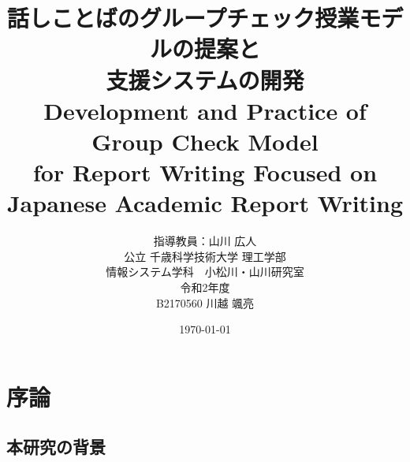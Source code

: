 \documentclass[11pt, a4paper]{jreport}
\begin{document}
\title{話しことばのグループチェック授業モデルの提案と\\支援システムの開発\\Development and Practice of Group Check Model \\for Report Writing Focused on\\Japanese Academic Report Writing}
\author{指導教員：山川 広人\\
公立 千歳科学技術大学 理工学部\\
情報システム学科　小松川・山川研究室\\
令和2年度\\
B2170560 川越 颯亮}
\date{\today}

\maketitle
{}
\tableofcontents

\chapter{序論}

\section{本研究の背景}
\end{document}
